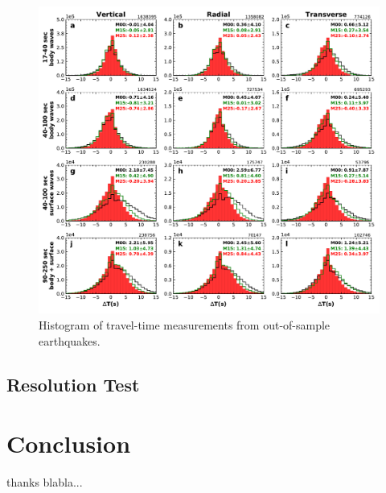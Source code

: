 \documentclass[extra,mreferee]{gji}
\begin{document}
\begin{figure}
\includegraphics[width=\textwidth]{figures/dt_histogram_360.pdf}
\caption{Histogram of travel-time measurements from out-of-sample earthquakes.}
\centering
\end{figure}

\subsection{Resolution Test}


\section{Conclusion}


\begin{acknowledgments}
thanks blabla...
\end{acknowledgments}

\cite{zhu2012structure}

\newpage



  
\end{document}
